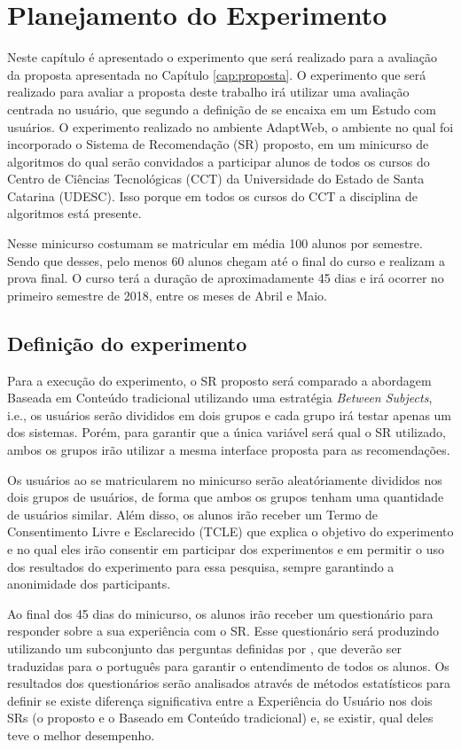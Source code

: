 \chapter{Planejamento do Experimento}

Neste capítulo é apresentado o experimento que será realizado para a avaliação da proposta apresentada no Capítulo \ref{cap:proposta}.
O experimento que será realizado para avaliar a proposta deste trabalho irá utilizar uma avaliação centrada no usuário,
que segundo a definição de  se encaixa em um Estudo com usuários. O experimento realizado
no ambiente AdaptWeb\textsuperscript{\textregistered}, o ambiente no qual foi incorporado o Sistema de Recomendação (SR)
proposto, em um minicurso de algoritmos do qual serão convidados a participar alunos de todos os cursos do Centro de
Ciências Tecnológicas (CCT) da Universidade do Estado de Santa Catarina (UDESC). Isso porque em todos os cursos do CCT
a disciplina de algoritmos está presente.

Nesse minicurso costumam se matricular em média 100 alunos por semestre. Sendo que desses, pelo menos 60 alunos chegam até
o final do curso e realizam a prova final. O curso terá a duração de aproximadamente 45 dias e irá ocorrer no primeiro semestre
de 2018, entre os meses de Abril e Maio.

\section{Definição do experimento}

Para a execução do experimento, o SR proposto será comparado a abordagem Baseada em Conteúdo tradicional utilizando uma
estratégia \textit{Between Subjects}, i.e., os usuários serão divididos em dois grupos e cada grupo irá testar apenas
um dos sistemas. Porém, para garantir que a única variável será qual o SR utilizado, ambos os grupos irão utilizar a mesma
interface proposta para as recomendações.

Os usuários ao se matricularem no minicurso serão aleatóriamente divididos nos dois grupos de usuários, de forma que ambos
os grupos tenham uma quantidade de usuários similar. Além disso, os alunos irão receber um Termo de Consentimento Livre
e Esclarecido (TCLE) que explica o objetivo do experimento e no qual eles irão consentir em participar dos experimentos e
em permitir o uso dos resultados do experimento para essa pesquisa, sempre garantindo a anonimidade dos participants.

Ao final dos 45 dias do minicurso, os alunos irão receber um questionário para responder sobre a sua experiência com o SR.
Esse questionário será produzindo utilizando um subconjunto das perguntas definidas por , que deverão ser
traduzidas para o português para garantir o entendimento de todos os alunos. Os resultados dos questionários serão
analisados através de métodos estatísticos para definir se existe diferença significativa entre a Experiência do Usuário
nos dois SRs (o proposto e o Baseado em Conteúdo tradicional) e, se existir, qual deles teve o melhor desempenho.

